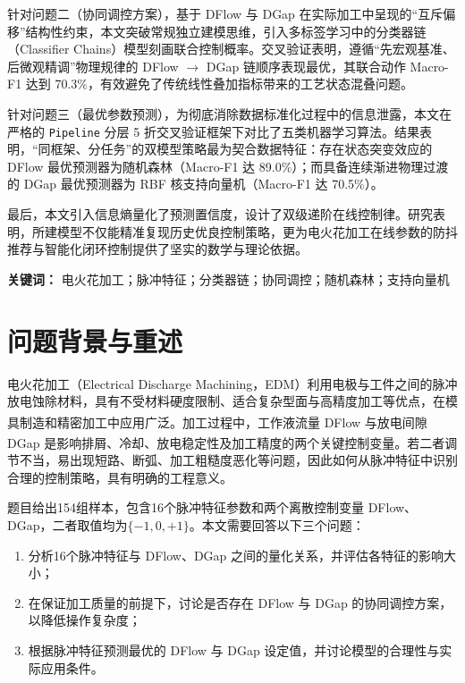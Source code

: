 \documentclass[UTF8,a4paper,12pt]{ctexart}
\newcommand{\upcite}[1]{\textsuperscript{\cite{#1}}}
\begin{document}
针对问题二（协同调控方案），基于 DFlow 与 DGap 在实际加工中呈现的“互斥偏移”结构性约束，本文突破常规独立建模思维，引入多标签学习中的分类器链（Classifier Chains）模型刻画联合控制概率。交叉验证表明，遵循“先宏观基准、后微观精调”物理规律的 DFlow $\rightarrow$ DGap 链顺序表现最优，其联合动作 Macro-F1 达到 70.3\%，有效避免了传统线性叠加指标带来的工艺状态混叠问题。

针对问题三（最优参数预测），为彻底消除数据标准化过程中的信息泄露，本文在严格的 \texttt{Pipeline} 分层 5 折交叉验证框架下对比了五类机器学习算法。结果表明，“同框架、分任务”的双模型策略最为契合数据特征：存在状态突变效应的 DFlow 最优预测器为随机森林（Macro-F1 达 89.0\%）；而具备连续渐进物理过渡的 DGap 最优预测器为 RBF 核支持向量机（Macro-F1 达 70.5\%）。

最后，本文引入信息熵量化了预测置信度，设计了双级递阶在线控制律。研究表明，所建模型不仅能精准复现历史优良控制策略，更为电火花加工在线参数的防抖推荐与智能化闭环控制提供了坚实的数学与理论依据。

\vspace{0.8em}
\noindent\textbf{关键词：} 电火花加工；脉冲特征；分类器链；协同调控；随机森林；支持向量机

\clearpage

\section{问题背景与重述}

电火花加工（Electrical Discharge Machining，EDM）利用电极与工件之间的脉冲放电蚀除材料，具有不受材料硬度限制、适合复杂型面与高精度加工等优点，在模具制造和精密加工中应用广泛\upcite{ref8,ref12}。加工过程中，工作液流量 DFlow 与放电间隙 DGap 是影响排屑、冷却、放电稳定性及加工精度的两个关键控制变量\upcite{ref13, ref14}。若二者调节不当，易出现短路、断弧、加工粗糙度恶化等问题，因此如何从脉冲特征中识别合理的控制策略，具有明确的工程意义。

题目给出154组样本，包含16个脉冲特征参数和两个离散控制变量 DFlow、DGap，二者取值均为$\{-1,0,+1\}$。本文需要回答以下三个问题：
\begin{enumerate}[label=(\arabic*),leftmargin=2em]
\item 分析16个脉冲特征与 DFlow、DGap 之间的量化关系，并评估各特征的影响大小；
\item 在保证加工质量的前提下，讨论是否存在 DFlow 与 DGap 的协同调控方案，以降低操作复杂度；
\item 根据脉冲特征预测最优的 DFlow 与 DGap 设定值，并讨论模型的合理性与实际应用条件。
\end{enumerate}
\end{document}
